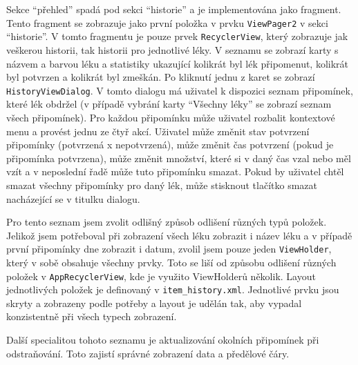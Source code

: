 \documentclass[../TakeYourPill.tex]{subfiles}
\begin{document}
Sekce \enquote{přehled} spadá pod sekci \enquote{historie} a je implementována jako fragment. Tento fragment se zobrazuje jako první položka v prvku \texttt{ViewPager2} v sekci \enquote{historie}. V tomto fragmentu je pouze prvek \texttt{RecyclerView}, který zobrazuje jak veškerou historii, tak historii pro jednotlivé léky. V seznamu se zobrazí karty s názvem a barvou léku a statistiky ukazující kolikrát byl lék připomenut, kolikrát byl potvrzen a kolikrát byl zmeškán. Po kliknutí jednu z karet se zobrazí \texttt{HistoryViewDialog}\label{sec:historydialog}. V tomto dialogu má uživatel k dispozici seznam připomínek, které lék obdržel (v případě vybrání karty \enquote{Všechny léky} se zobrazí seznam všech připomínek). Pro každou připomínku může uživatel rozbalit kontextové menu a provést jednu ze čtyř akcí. Uživatel může změnit stav potvrzení připomínky (potvrzená x nepotvrzená), může změnit čas potvrzení (pokud je připomínka potvrzena), může změnit množství, které si v daný čas vzal nebo měl vzít a v neposlední řadě může tuto připomínku smazat. Pokud by uživatel chtěl smazat všechny připomínky pro daný lék, může stisknout tlačítko smazat nacházející se v titulku dialogu.

Pro tento seznam jsem zvolit odlišný způsob odlišení různých typů položek. Jelikož jsem potřeboval při zobrazení všech léku zobrazit i název léku a v případě první připomínky dne zobrazit i datum, zvolil jsem pouze jeden \texttt{ViewHolder}, který v sobě obsahuje všechny prvky. Toto se liší od způsobu odlišení různých položek v \texttt{AppRecyclerView}, kde je využito ViewHolderů několik. Layout jednotlivých položek je definovaný v \texttt{item\_history.xml}. Jednotlivé prvku jsou skryty a zobrazeny podle potřeby a layout je udělán tak, aby vypadal konzistentně při všech typech zobrazení.

Další specialitou tohoto seznamu je aktualizování okolních připomínek při odstraňování. Toto zajistí správné zobrazení data a předělové čáry.
\end{document}
